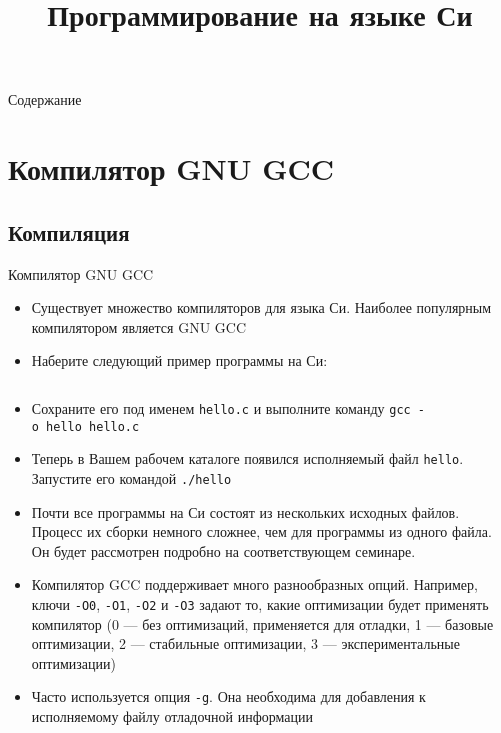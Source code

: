 \documentclass{beamer}
\title{Программирование на языке Си}
\date{}
\begin{document}
	
\begin{frame}
	\maketitle
\end{frame}
	
\begin{frame}[allowframebreaks]{Содержание}
	\tableofcontents
\end{frame}
	
\section{Компилятор GNU GCC}

\subsection{Компиляция}
\begin{frame}{Компилятор GNU GCC}
	\begin{itemize}
		\item{Существует множество компиляторов для языка Си. Наиболее популярным компилятором является GNU GCC}\pause
		\item{Наберите следующий пример программы на Си:}
	\end{itemize}
	\vspace*{-\baselineskip}
	\inputminted[linenos,bgcolor=listing]{C}{files/c_programming_langauge/hello.c}\pause
	\vspace*{-\baselineskip}
	\begin{itemize}
		\item{Сохраните его под именем \texttt{hello.c} и выполните команду \texttt{gcc~-o~hello~hello.c}}
	\end{itemize}
\end{frame}

\begin{frame}
	\begin{itemize}
		\item{Теперь в Вашем рабочем каталоге появился исполняемый файл \texttt{hello}. Запустите его командой \texttt{./hello}}\pause
		\item{Почти все программы на Си состоят из нескольких исходных файлов. Процесс их сборки немного сложнее, чем для программы из одного файла. Он будет рассмотрен подробно на соответствующем семинаре.}\pause
		\item{Компилятор GCC поддерживает много разнообразных опций. Например, ключи \texttt{-O0}, \texttt{-O1}, \texttt{-O2} и \texttt{-O3} задают то, какие оптимизации будет применять компилятор (0 --- без оптимизаций, применяется для отладки, 1 --- базовые оптимизации, 2 --- стабильные оптимизации, 3 --- экспериментальные оптимизации)}\pause
		\item{Часто используется опция \texttt{-g}. Она необходима для добавления к исполняемому файлу отладочной информации}
	\end{itemize}
\end{frame}
\end{document}
